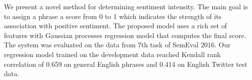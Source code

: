 We present a novel method for determining sentiment intensity. The main goal is to assign a phrase a score from 0 to 1 which indicates the strength of its association with positive sentiment. The proposed model uses a rich set of features with Gaussian processes regression model that computes the final score. The system was evaluated on the data from 7th task of SemEval 2016. Our regression model trained on the development data reached Kendall rank correlation of 0.659 on general English phrases and 0.414 on English Twitter test data.
